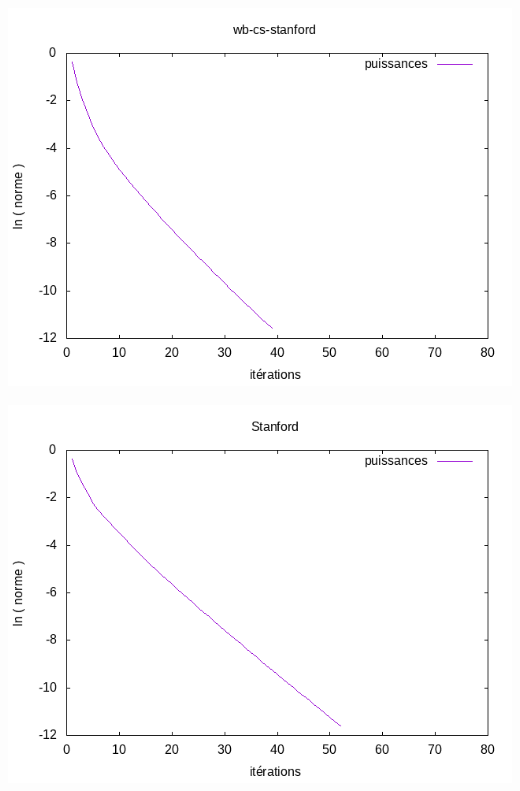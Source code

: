 		\begin{minipage}[c]{.46\linewidth}
			\begin{center}
				\includegraphics[scale=0.5]{plot-wb-cs-stanford.png}
			\end{center}
		\end{minipage} \hfill
		\begin{minipage}[c]{.46\linewidth}
			\begin{center}
				\includegraphics[scale=0.5]{plot-Stanford.png}
			\end{center}
		\end{minipage}
			
